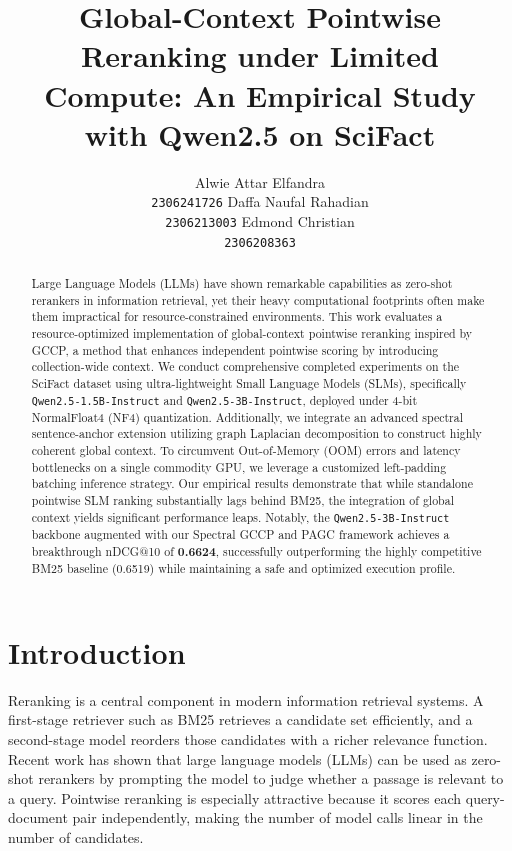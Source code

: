 \documentclass[11pt]{article}
\title{Global-Context Pointwise Reranking under Limited Compute: An Empirical Study with Qwen2.5 on SciFact}
\author{
  Alwie Attar Elfandra \\
  \texttt{2306241726}
  \And
  Daffa Naufal Rahadian \\
  \texttt{2306213003}
  \And
  Edmond Christian \\
  \texttt{2306208363}
}
\begin{document}
\maketitle

\begin{abstract}
Large Language Models (LLMs) have shown remarkable capabilities as zero-shot rerankers in information retrieval, yet their heavy computational footprints often make them impractical for resource-constrained environments. This work evaluates a resource-optimized implementation of global-context pointwise reranking inspired by GCCP, a method that enhances independent pointwise scoring by introducing collection-wide context. We conduct comprehensive completed experiments on the SciFact dataset using ultra-lightweight Small Language Models (SLMs), specifically \texttt{Qwen2.5-1.5B-Instruct} and \texttt{Qwen2.5-3B-Instruct}, deployed under 4-bit NormalFloat4 (NF4) quantization. Additionally, we integrate an advanced spectral sentence-anchor extension utilizing graph Laplacian decomposition to construct highly coherent global context. To circumvent Out-of-Memory (OOM) errors and latency bottlenecks on a single commodity GPU, we leverage a customized left-padding batching inference strategy. Our empirical results demonstrate that while standalone pointwise SLM ranking substantially lags behind BM25, the integration of global context yields significant performance leaps. Notably, the \texttt{Qwen2.5-3B-Instruct} backbone augmented with our Spectral GCCP and PAGC framework achieves a breakthrough nDCG@10 of \textbf{0.6624}, successfully outperforming the highly competitive BM25 baseline (0.6519) while maintaining a safe and optimized execution profile.
\end{abstract}

\section{Introduction}

Reranking is a central component in modern information retrieval systems. A first-stage retriever such as BM25 retrieves a candidate set efficiently, and a second-stage model reorders those candidates with a richer relevance function. Recent work has shown that large language models (LLMs) can be used as zero-shot rerankers by prompting the model to judge whether a passage is relevant to a query. Pointwise reranking is especially attractive because it scores each query-document pair independently, making the number of model calls linear in the number of candidates.
\end{document}
